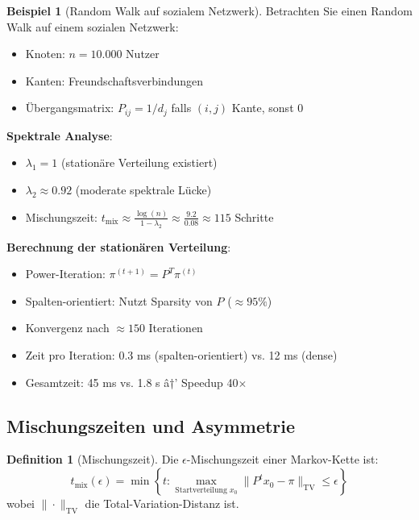 ﻿\documentclass[a4paper,12pt]{report}
\theoremstyle{definition}
\newtheorem{definition}{Definition}
\newtheorem{beispiel}{Beispiel}
\begin{document}
	\begin{beispiel}[Random Walk auf sozialem Netzwerk]
		Betrachten Sie einen Random Walk auf einem sozialen Netzwerk:
		\begin{itemize}
			\item Knoten: $n = 10.000$ Nutzer
			\item Kanten: Freundschaftsverbindungen
			\item Übergangsmatrix: $P_{ij} = 1/d_j$ falls $(i,j)$ Kante, sonst 0
		\end{itemize}
		
		\textbf{Spektrale Analyse}:
		\begin{itemize}
			\item $\lambda_1 = 1$ (stationäre Verteilung existiert)
			\item $\lambda_2 \approx 0.92$ (moderate spektrale Lücke)
			\item Mischungszeit: $t_{\text{mix}} \approx \frac{\log(n)}{1 - \lambda_2} \approx \frac{9.2}{0.08} \approx 115$ Schritte
		\end{itemize}
		
		\textbf{Berechnung der stationären Verteilung}:
		\begin{itemize}
			\item Power-Iteration: $\pi^{(t+1)} = P^T \pi^{(t)}$
			\item Spalten-orientiert: Nutzt Sparsity von $P$ ($\approx 95\%$)
			\item Konvergenz nach $\approx 150$ Iterationen
			\item Zeit pro Iteration: 0.3 ms (spalten-orientiert) vs. 12 ms (dense)
			\item Gesamtzeit: 45 ms vs. 1.8 s â†’ Speedup 40$\times$
		\end{itemize}
	\end{beispiel}
	
	\subsection{Mischungszeiten und Asymmetrie}
	
	\begin{definition}[Mischungszeit]
		Die $\epsilon$-Mischungszeit einer Markov-Kette ist:
		\[
		t_{\text{mix}}(\epsilon) = \min \left\{ t : \max_{\text{Startverteilung } x_0} \|P^t x_0 - \pi\|_{\text{TV}} \leq \epsilon \right\}
		\]
		wobei $\|\cdot\|_{\text{TV}}$ die Total-Variation-Distanz ist.
	\end{definition}
	
\end{document}
